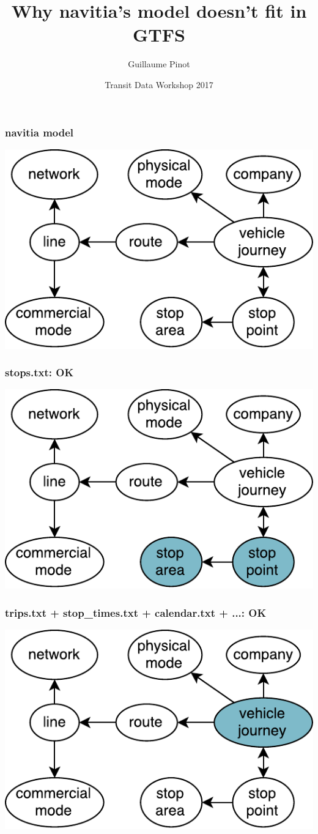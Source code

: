 \documentclass[table]{beamer}
\title{Why navitia's model doesn't fit in GTFS}
\author{Guillaume Pinot}
\institute[Kisio Digital] %
{
  Kisio Digital\\
  20 rue Hector Malot\\
  75012 Paris, France}
\date{Transit Data Workshop 2017}
\begin{document}
\begin{frame}
  \titlepage
\end{frame}

\begin{frame}
  \frametitle{navitia model}

  \centering\includegraphics[width=0.9\linewidth]{images/navitia-model}
\end{frame}

\begin{frame}
  \frametitle{stops.txt: OK}

  \centering\includegraphics[width=0.9\linewidth]{images/navitia-model-stops}
\end{frame}

\begin{frame}
  \frametitle{trips.txt + stop\_times.txt + calendar.txt + ...: OK}

  \centering\includegraphics[width=0.9\linewidth]{images/navitia-model-trips}
\end{frame}
\end{document}
